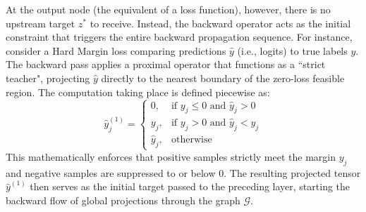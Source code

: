 At the output node (the equivalent of a loss function), however, there is no upstream target $z^*$ to receive. Instead, the backward operator acts as the initial constraint that triggers the entire backward propagation sequence. For instance, consider a Hard Margin loss comparing predictions $\hat{y}$ (i.e., logits) to true labels $y$. The backward pass applies a proximal operator that functions as a ``strict teacher", projecting $\hat{y}$ directly to the nearest boundary of the zero-loss feasible region. The computation taking place is defined piecewise as:
\begin{equation}
    \hat{y}^{(1)}_j = 
    \begin{cases} 
        0, & \text{if } y_j \le 0 \text{ and } \hat{y}_j > 0 \\
        y_j, & \text{if } y_j > 0 \text{ and } \hat{y}_j < y_j \\
        \hat{y}_j, & \text{otherwise}
    \end{cases}
\end{equation}
This mathematically enforces that positive samples strictly meet the margin $y_j$ and negative samples are suppressed to or below $0$. The resulting projected tensor $\hat{y}^{(1)}$ then serves as the initial target passed to the preceding layer, starting the backward flow of global projections through the graph $\mathcal{G}$.
